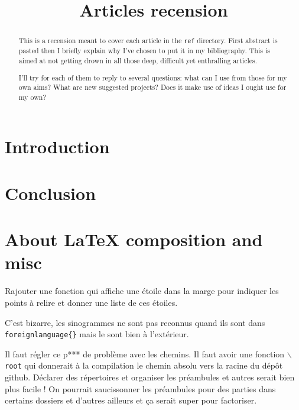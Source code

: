 \documentclass[12pt,onecolumn]{article} %
\title{Articles recension}
\author{}
\begin{document}
\maketitle
{}
\begin{abstract}
\par This is a recension meant to cover each article in the \texttt{ref} directory. First abstract is pasted then I briefly explain why I've chosen to put it in my bibliography. This is aimed at not getting drown in all those deep, difficult yet enthralling articles.\par I'll try for each of them to reply to several questions: what can I use from those for my own aims? What are new suggested projects? Does it make use of ideas I ought use for my own?
\end{abstract}

\tableofcontents
\cleardoublepage

\section*{Introduction}

\section{}


\section*{Conclusion}

\section*{About \LaTeX{} composition and misc}
Rajouter une fonction qui affiche une étoile dans la marge pour indiquer les points à relire et donner une liste de ces étoiles.

C'est bizarre, les sinogrammes ne sont pas reconnus quand ils sont dans \texttt{foreignlanguage\{\}} mais le sont bien à l'extérieur.

Il faut régler ce p*** de problème avec les chemins. Il faut avoir une fonction \texttt{$\backslash$root} qui donnerait à la compilation le chemin absolu vers la racine du dépôt github. Déclarer des répertoires et organiser les préambules et autres serait bien plus facile ! On pourrait saucissonner les préambules pour des parties dans certains dossiers et d'autres ailleurs et ça serait super pour factoriser.
\end{document}
